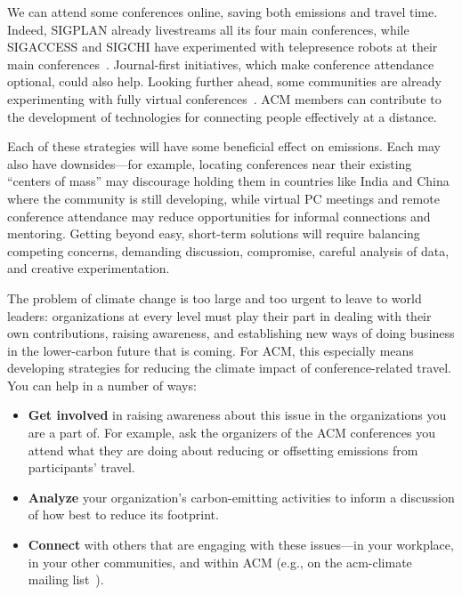 \documentclass[12pt]{article}
\begin{document}
We can attend some conferences online, saving both emissions and travel
time.  Indeed, SIGPLAN already livestreams all its four main conferences,
while SIGACCESS and SIGCHI have experimented with telepresence robots at
their main conferences~\cite{CHI-remote,Neustaedter}. Journal-first
initiatives, which make conference attendance optional, could also help.
Looking further ahead, some communities are already experimenting with fully
virtual conferences~\cite{OS}.  ACM members can contribute to the
development of technologies for connecting people effectively at a distance.

Each of these strategies will have some beneficial effect on emissions.
Each may also have downsides---for example, locating conferences near their
existing ``centers of mass'' may discourage holding them in countries like
India and China where the community is still developing, while virtual PC
meetings and remote conference attendance may reduce opportunities for
informal connections and mentoring.  Getting beyond easy, short-term
solutions will require balancing competing concerns, demanding discussion,
compromise, careful analysis of data, and creative experimentation.

The problem of climate change is too large and too urgent to leave to world
leaders: organizations at every level must play their part in dealing with
their own contributions, raising awareness, and establishing new ways of
doing business in the lower-carbon future that is coming. For ACM, this
especially means developing strategies for reducing the climate impact of
conference-related travel. You can help in a number of ways: 
\begin{itemize}
\item {\bf Get involved} in raising awareness about this issue in the
organizations you are a part of.  For example, ask the organizers of the ACM
conferences you attend what they are doing about reducing or offsetting
emissions from participants’ travel.
\item {\bf Analyze} your organization’s carbon-emitting activities to inform a
discussion of how best to reduce its footprint.
\item {\bf Connect} with others that are engaging with these issues---in
your workplace, in your other communities, and within ACM (e.g., on the
acm-climate mailing list~\cite{acm-climate}).
\end{itemize}



\end{document}
